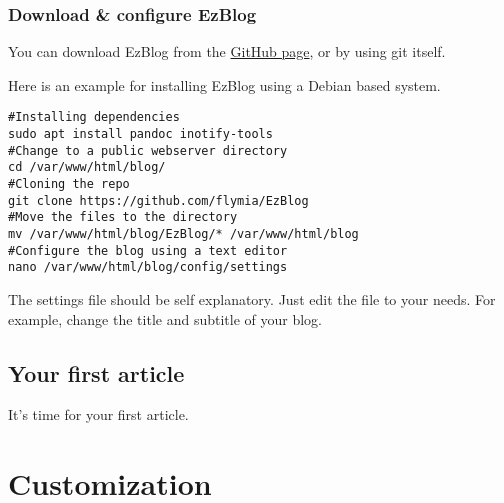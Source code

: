 \documentclass[12pt,a4paper]{article}
\begin{document}
\subsubsection{Download \& configure EzBlog}

You can download EzBlog from the \href{https://github.com/flymia/EzBlog}{GitHub page}, or by using git itself.

Here is an example for installing EzBlog using a Debian based system.
\begin{lstlisting}
#Installing dependencies
sudo apt install pandoc inotify-tools
#Change to a public webserver directory
cd /var/www/html/blog/
#Cloning the repo
git clone https://github.com/flymia/EzBlog
#Move the files to the directory
mv /var/www/html/blog/EzBlog/* /var/www/html/blog
#Configure the blog using a text editor
nano /var/www/html/blog/config/settings
\end{lstlisting}

The settings file should be self explanatory. Just edit the file to your needs. For example, change the title and subtitle of your blog.

\subsection{Your first article}

It's time for your first article.

\section{Customization}
\end{document}

